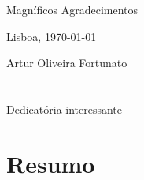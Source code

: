 
Magníficos Agradecimentos

\vfill
\begin{flushright}
  \begin{minipage}{8cm}
    \begin{center}
      Lisboa, \today

      Artur Oliveira Fortunato
    \end{center}
  \end{minipage}
\end{flushright}

\cleardoublepage


\chapter*{}
\thispagestyle{empty}

\vfill
\mbox{}
\vfill\Large
\begin{flushright}
  \begin{minipage}{8cm}
    \begin{center}

Dedicatória interessante

    \end{center}
  \end{minipage}
\end{flushright}
\normalsize\vfill

\cleardoublepage


\chapter*{Resumo}
\thispagestyle{empty}


